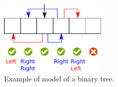 \documentclass{llncs}
\newcommand{\spark}{SPARK\xspace}
\begin{document}





\begin{figure}[ht]
\begin{center}
\includegraphics[width=5cm]{model.pdf}
\caption{\label{fig-binary-mod-ex} Example of model of a binary tree.}
\end{center}
\end{figure}

\end{document}
